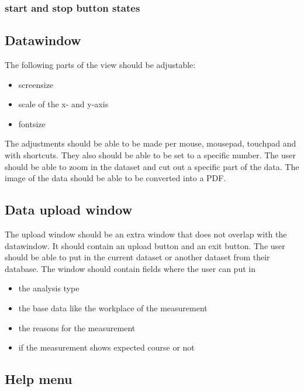\documentclass{scrreprt}
\begin{document}
\subsubsection{start and stop button states}



\subsection{Datawindow}

The following parts of the view should be adjustable: 

\begin{itemize}
    \item screensize
    \item scale of the x- and y-axis 
    \item fontsize 
\end{itemize}

The adjustments should be able to be made per mouse, mousepad, touchpad and with shortcuts. They also should be able to be set to a specific number. 
The user should be able to zoom in the dataset and cut out a specific part of the data. The image of the data should be able to be converted into a PDF. 

\subsection{Data upload window}

The upload window should be an extra window that does not overlap with the datawindow. It should contain an upload button and an exit button. The user should be able to put in the 
current dataset or another dataset from their database. 
The window should contain fields where the user can put in 
\begin{itemize}
    \item the analysis type
    \item the base data like the workplace of the measurement
    \item the reasons for the measurement
    \item if the measurement shows expected course or not 
\end{itemize}



\subsection{Help menu}
\end{document}
